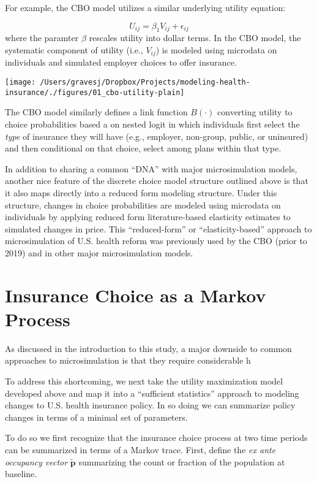 \documentclass[]{article}
\begin{document}
For example, the CBO model utilizes a similar underlying utility
equation:

\[
U_{ij} = \beta_1 V_{ij} + \epsilon_{ij}
\] \noindent where the paramter \(\beta\) rescales utility into dollar
terms. In the CBO model, the systematic component of utility (i.e.,
\(V_{ij}\)) is modeled using microdata on individuals and simulated
employer choices to offer insurance.

\texttt{[image: /Users/gravesj/Dropbox/Projects/modeling-health-insurance/./figures/01\_cbo-utility-plain]}

The CBO model similarly defines a link function \(B(\cdot)\) converting
utility to choice probabilities based a on nested logit in which
individuals first select the \emph{type} of insurance they will have
(e.g., employer, non-group, public, or uninsured) and then conditional
on that choice, select among plans within that type.

In addition to sharing a common ``DNA'' with major microsimulation
models, another nice feature of the discrete choice model structure
outlined above is that it also maps directly into a reduced form
modeling structure. Under this structure, changes in choice
probabilities are modeled using microdata on individuals by applying
reduced form literature-based elasticity estimates to simulated changes
in price. This ``reduced-form'' or ``elasticity-based'' approach to
microsimulation of U.S. health reform was previously used by the CBO
(prior to 2019) and in other major microsimulation models.

\hypertarget{insurance-choice-as-a-markov-process}{%
\section{Insurance Choice as a Markov
Process}\label{insurance-choice-as-a-markov-process}}

As discussed in the introduction to this study, a major downside to
common approaches to microsimulation is that they require considerable h

To address this shortcoming, we next take the utility maximization model
developed above and map it into a ``sufficient statistics'' approach to
modeling changes to U.S. health insurance policy. In so doing we can
summarize policy changes in terms of a minimal set of parameters.

To do so we first recognize that the insurance choice process at two
time periods can be summarized in terms of a Markov trace. First, define
the \emph{ex ante occupancy vector} \(\mathbf{\tilde p}\) summarizing
the count or fraction of the population at baseline.
\end{document}
